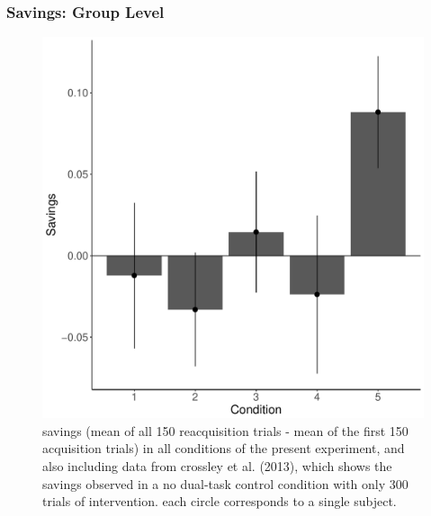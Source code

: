 \subsubsection*{Savings: Group Level} 
\begin{figure}[t]
  \centering \includegraphics[width=1.0\textwidth]{../figures/fig_savings.pdf}
  \caption{
    savings (mean of all 150 reacquisition trials - mean of the first 150
    acquisition trials) in all conditions of the present experiment, and also
    including data from crossley et al. (2013), which shows the savings observed in
    a no dual-task control condition with only 300 trials of intervention. each
    circle corresponds to a single subject.
  }
  \label{fig:savings}
\end{figure}


